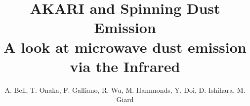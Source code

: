 \documentclass[preprint2,longabstract]{aastex}
\begin{document}

\title{AKARI and Spinning Dust Emission\\
A look at microwave dust emission via the Infrared}



\author{A. Bell, T. Onaka, F. Galliano, R. Wu, M. Hammonds, Y. Doi, D. Ishihara, M. Giard}






\end{document}
